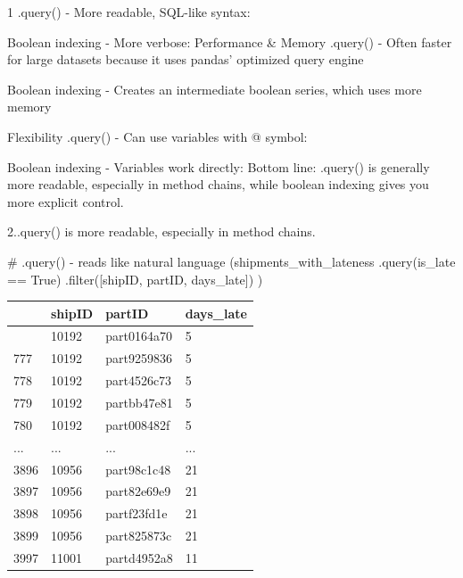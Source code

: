 \documentclass[
  letterpaper,
  DIV=11,
  numbers=noendperiod]{scrartcl}
\newenvironment{Shaded}{\begin{snugshade}}{\end{snugshade}}
\newcommand{\BuiltInTok}[1]{\textcolor[rgb]{0.00,0.23,0.31}{#1}}
\newcommand{\CommentTok}[1]{\textcolor[rgb]{0.37,0.37,0.37}{#1}}
\newcommand{\NormalTok}[1]{\textcolor[rgb]{0.00,0.23,0.31}{#1}}
\newcommand{\StringTok}[1]{\textcolor[rgb]{0.13,0.47,0.30}{#1}}
\begin{document}
1 .query() - More readable, SQL-like syntax:

Boolean indexing - More verbose: Performance \& Memory .query() - Often
faster for large datasets because it uses pandas' optimized query engine

Boolean indexing - Creates an intermediate boolean series, which uses
more memory

Flexibility .query() - Can use variables with @ symbol:

Boolean indexing - Variables work directly: Bottom line: .query() is
generally more readable, especially in method chains, while boolean
indexing gives you more explicit control.

2..query() is more readable, especially in method chains.

\begin{Shaded}
\begin{Highlighting}[]
\CommentTok{\# .query() {-} reads like natural language}
\NormalTok{(shipments\_with\_lateness}
\NormalTok{    .query(}\StringTok{\textquotesingle{}is\_late == True\textquotesingle{}}\NormalTok{)}
\NormalTok{    .}\BuiltInTok{filter}\NormalTok{([}\StringTok{\textquotesingle{}shipID\textquotesingle{}}\NormalTok{, }\StringTok{\textquotesingle{}partID\textquotesingle{}}\NormalTok{, }\StringTok{\textquotesingle{}days\_late\textquotesingle{}}\NormalTok{])}
\NormalTok{)}
\end{Highlighting}
\end{Shaded}

\label{mental-model-2-subset-examples}
\begin{longtable}[]{@{}llll@{}}
\toprule\noalign{}
& shipID & partID & days\_late \\
\midrule\noalign{}
\endhead
\bottomrule\noalign{}
\endlastfoot
776 & 10192 & part0164a70 & 5 \\
777 & 10192 & part9259836 & 5 \\
778 & 10192 & part4526c73 & 5 \\
779 & 10192 & partbb47e81 & 5 \\
780 & 10192 & part008482f & 5 \\
... & ... & ... & ... \\
3896 & 10956 & part98c1c48 & 21 \\
3897 & 10956 & part82e69e9 & 21 \\
3898 & 10956 & partf23fd1e & 21 \\
3899 & 10956 & part825873c & 21 \\
3997 & 11001 & partd4952a8 & 11 \\
\end{longtable}
\end{document}
